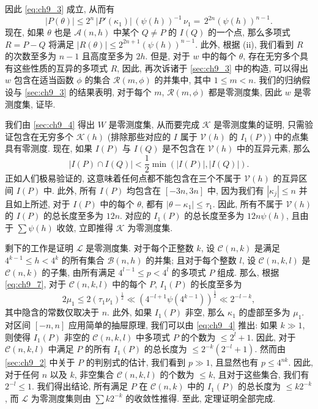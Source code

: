 因此 \eqref{eq:ch9_3} 成立, 从而有
\[\big|P(\theta)\big|\leqslant 2^n\, \big|P'(\kappa_1)\big|\, (\psi(h))^{-1}\, \nu_1=\, 2^{2n}(\psi(h))^{n-1}.\]
现在, 如果 $\theta$ 也是 $\mathscr{A}(n,h)$ 中某个 $Q \neq P$ 的 $I(Q)$ 的一个点, 那么多项式 $R = P - Q$ 将满足 $|R(\theta)| \leq 2^{2n+1} (\psi(h))^{n-1}$. 此外, 根据 (ii), 我们看到 $R$ 的次数至多为 $n-1$ 且高度至多为 $2h$. 但是, 对于 $w$ 中的每个 $\theta$, 存在无穷多个具有这些性质的互异的多项式 $R$, 因此, 再次诉诸于 \autoref{sec:ch9_3} 中的构造, 可以得出 $w$ 包含在适当函数 $\phi$ 的集合 $\mathscr{R}(m,\phi)$ 的并集中, 其中 $1 \leq m < n$. 我们的归纳假设与 \autoref{sec:ch9_3} 的结果表明, 对于每个 $m$, $\mathscr{R}(m,\phi)$ 都是零测度集, 因此 $w$ 是零测度集, 证毕.

我们由 \autoref{sec:ch9_4} 得出 $W$ 是零测度集, 从而要完成 $\mathscr{K}$ 是零测度集的证明, 只需验证包含在无穷多个 $\mathscr{K}(h)$ (排除那些对应的 $I$ 属于 $\mathscr{V}(h)$ 的 $I_1(P)$) 中的点集具有零测度. 现在, 如果 $I(P)$ 与 $I(Q)$ 是不包含在 $\mathscr{V}(h)$ 中的互异元素, 那么
\[|I(P) \cap I(Q)| < \frac{1}{2} \min(|I(P)|, |I(Q)|).\]
正如人们极易验证的, 这意味着任何点都不能包含在三个不属于 $\mathscr{V}(h)$ 的互异区间 $I(P)$ 中. 此外, 所有 $I(P)$ 均包含在 $[-3n,3n]$ 中, 因为我们有 $|\kappa_j| \leq n$ 并且如上所述, 对于 $I(P)$ 中的每个 $\theta$, 都有 $|\theta-\kappa_1| \leq \tau_1$. 因此, 所有不属于 $\mathscr{V}(h)$ 的 $I(P)$ 的总长度至多为 $12n$. 对应的 $I_1(P)$ 的总长度至多为 $12n\psi(h)$, 且由于 $\sum \psi(h)$ 收敛, 立即推得 $\mathscr{K}$ 为零测度集.

剩下的工作是证明 $\mathscr{L}$ 是零测度集. 对于每个正整数 $k$, 设 $\mathscr{C}(n,k)$ 是满足 $4^{k-1} \leq h < 4^k$ 的所有集合 $\mathscr{B}(n,h)$ 的并集; 且对于每个整数 $l$, 设 $\mathscr{C}(n,k,l)$ 是 $\mathscr{C}(n,k)$ 的子集, 由所有满足 $4^{l-1} \leq p < 4^l$ 的多项式 $P$ 组成. 那么, 根据 \eqref{eq:ch9_7}, 对于 $\mathscr{C}(n,k,l)$ 中的每个 $P$, $I_1(P)$ 的长度至多为
\[2\mu_1 \leq 2(\tau_1 \nu_1)^{\frac{1}{2}} \ll (4^{-l+1}\psi(4^{k-1}))^{\frac{1}{2}} \ll 2^{-l-k},\]
其中隐含的常数仅取决于 $n$. 此外, 如果 $I_1(P)$ 非空, 那么 $\kappa_1$ 的虚部至多为 $\mu_1$. 对区间 $[-n,n]$ 应用简单的抽屉原理, 我们可以由 \eqref{eq:ch9_4} 推出: 如果 $k \gg 1$, 则使得 $I_1(P)$ 非空的 $\mathscr{C}(n,k,l)$ 中多项式 $P$ 的个数为 $\leqslant 2^l+1$. 因此, 对于 $\mathscr{C}(n,k,l)$ 中满足 $P$ 的所有 $I_1(P)$ 的总长度为 $\leqslant 2^{-k}(2^{-l}+1)$. 然而由 \autoref{sec:ch9_2} 中关于 $P$ 的判别式的估计, 我们看到 $p \gg 1$, 且显然也有 $p \leqslant 4^{nk}$. 因此, 对于任何 $n$ 以及 $k$, 非空集合 $\mathscr{C}(n,k,l)$ 的个数为 $\leqslant k$, 且对于这些集合, 我们有 $2^{-l} \leqslant 1$. 我们得出结论, 所有满足 $P$ 在 $\mathscr{C}(n,k)$ 中的 $I_1(P)$ 的总长度为 $\leqslant k2^{-k}$, 而 $\mathscr{L}$ 为零测度集则由 $\sum k2^{-k}$ 的收敛性推得. 至此, 定理证明全部完成.
